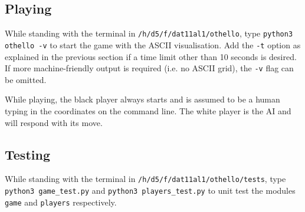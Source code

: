 \documentclass{article}
\begin{document}
\subsection{Playing}
While standing with the terminal in \texttt{/h/d5/f/dat11al1/othello}, type \texttt{python3 othello -v} to start the game with the ASCII visualisation. Add the \texttt{-t} option as explained in the previous section if a time limit other than 10 seconds is desired. If more machine-friendly output is required (i.e. no ASCII grid), the \texttt{-v} flag can be omitted.

While playing, the black player always starts and is assumed to be a human typing in the coordinates on the command line. The white player is the AI and will respond with its move.

\subsection{Testing}
While standing with the terminal in \texttt{/h/d5/f/dat11al1/othello/tests}, type \texttt{python3 game\_test.py} and \texttt{python3 players\_test.py} to unit test the modules \texttt{game} and \texttt{players} respectively.



\end{document}
